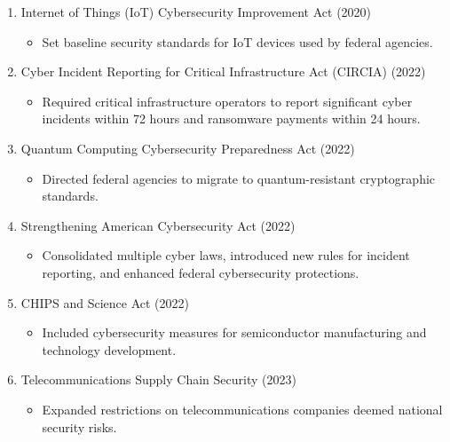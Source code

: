 \begin{enumerate}
\begin{description}
\begin{enumerate}[label=\arabic*., leftmargin=-0.5em]
\begin{itemize}
			\end{itemize}
			\item Internet of Things (IoT) Cybersecurity Improvement Act (2020)
			\begin{itemize}
				\item Set baseline security standards for IoT devices used by federal agencies.
			\end{itemize}
			\item Cyber Incident Reporting for Critical Infrastructure Act (CIRCIA) (2022)
			\begin{itemize}
				\item Required critical infrastructure operators to report significant cyber incidents within 72 hours and ransomware payments within 24 hours.
			\end{itemize}
			\item Quantum Computing Cybersecurity Preparedness Act (2022)
			\begin{itemize}
				\item Directed federal agencies to migrate to quantum-resistant cryptographic standards.
			\end{itemize}
			\item Strengthening American Cybersecurity Act (2022)
			\begin{itemize}
				\item Consolidated multiple cyber laws, introduced new rules for incident reporting, and enhanced federal cybersecurity protections.
			\end{itemize}
			\item CHIPS and Science Act (2022)
			\begin{itemize}
				\item Included cybersecurity measures for semiconductor manufacturing and technology development.
			\end{itemize}
			\item Telecommunications Supply Chain Security (2023)
			\begin{itemize}
				\item Expanded restrictions on telecommunications companies deemed national security risks.
			\end{itemize}
        \end{enumerate} \\
    \end{description}


\end{enumerate}
